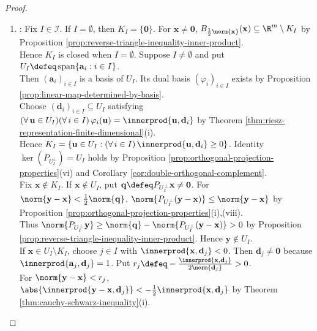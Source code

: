 \begin{lemma}
\begin{proof}
\begin{enumerate}[label=(\roman*)]
\begin{enumerate}[label=(\alph*)]
Deleting the zero coefficients contradicts minimality of $\abs{I}$, so $I\in\mathcal{I}$. Since $\mathbf{0}\in K_{\emptyset}$, $C_A=\bigcup\limits_{I\in\mathcal{I}}K_I$.
\item {}: Fix $I\in\mathcal{I}$. If $I=\emptyset$, then $K_I=\{\mathbf{0}\}$. For $\mathbf{x}\neq\mathbf{0}$, $B_{\frac{1}{2}\norm{\mathbf{x}}}(\mathbf{x})\subseteq\R^m\setminus K_I$ by Proposition \ref{prop:reverse-triangle-inequality-inner-product}.\\
Hence $K_I$ is closed when $I=\emptyset$. Suppose $I\neq\emptyset$ and put $U_I\defeq\operatorname{span}\{\mathbf{a}_i:i\in I\}$.\\
Then $(\mathbf{a}_i)_{i\in I}$ is a basis of $U_I$. Its dual basis $(\varphi_i)_{i\in I}$ exists by Proposition \ref{prop:linear-map-determined-by-basis}.\\
Choose $(\mathbf{d}_i)_{i\in I}\subseteq U_I$ satisfying $(\forall\,\mathbf{u}\in U_I)(\forall\,i\in I)\,\varphi_i(\mathbf{u})=\innerprod{\mathbf{u},\mathbf{d}_i}$ by Theorem \ref{thm:riesz-representation-finite-dimensional}(i).\\
Hence $K_I=\{\mathbf{u}\in U_I:(\forall\,i\in I)\,\innerprod{\mathbf{u},\mathbf{d}_i}\geq0\}$. Identity $\ker(P_{U_I^\perp})=U_I$ holds by Proposition \ref{prop:orthogonal-projection-properties}(vi) and Corollary \ref{cor:double-orthogonal-complement}.\\
Fix $\mathbf{x}\notin K_I$. If $\mathbf{x}\notin U_I$, put $\mathbf{q}\defeq P_{U_I^\perp}\mathbf{x}\neq\mathbf{0}$. For $\norm{\mathbf{y}-\mathbf{x}}<\frac{1}{2}\norm{\mathbf{q}}$, $\norm{P_{U_I^\perp}(\mathbf{y}-\mathbf{x})}\leq\norm{\mathbf{y}-\mathbf{x}}$ by Proposition \ref{prop:orthogonal-projection-properties}(i),(viii).\\
Thus $\norm{P_{U_I^\perp}\mathbf{y}}\geq\norm{\mathbf{q}}-\norm{P_{U_I^\perp}(\mathbf{y}-\mathbf{x})}>0$ by Proposition \ref{prop:reverse-triangle-inequality-inner-product}. Hence $\mathbf{y}\notin U_I$.\\
If $\mathbf{x}\in U_I\setminus K_I$, choose $j\in I$ with $\innerprod{\mathbf{x},\mathbf{d}_j}<0$. Then $\mathbf{d}_j\neq\mathbf{0}$ because $\innerprod{\mathbf{a}_j,\mathbf{d}_j}=1$. Put $r_j\defeq-\frac{\innerprod{\mathbf{x},\mathbf{d}_j}}{2\norm{\mathbf{d}_j}}>0$.\\
For $\norm{\mathbf{y}-\mathbf{x}}<r_j$, $\abs{\innerprod{\mathbf{y}-\mathbf{x},\mathbf{d}_j}}<-\frac{1}{2}\innerprod{\mathbf{x},\mathbf{d}_j}$ by Theorem \ref{thm:cauchy-schwarz-inequality}(i).\\

\end{enumerate}
\end{enumerate}
\end{proof}
\end{lemma}
